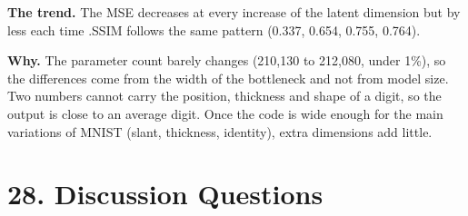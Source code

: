 \documentclass[10pt]{article}
\begin{document}
\textbf{The trend.} The MSE decreases at every increase of the latent dimension
but by less each time .SSIM follows the same pattern (0.337, 0.654, 0.755, 0.764).

\textbf{Why.} The parameter count barely changes (210,130 to 212,080, under 1\%),
so the differences come from the width of the bottleneck and not from model size.
Two numbers cannot carry the position, thickness and shape of a digit, so the
output is close to an average digit. Once the code is wide enough for the main
variations of MNIST (slant, thickness, identity), extra dimensions add little.

\section*{28. Discussion Questions}
\end{document}
